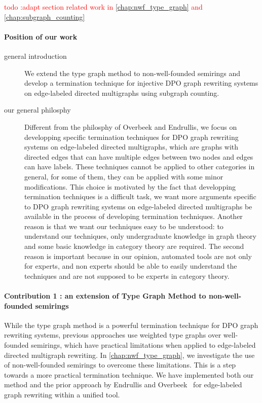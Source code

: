 \textcolor{red}{todo :adapt section related work in \autoref{chap:nwf_type_graph} and \autoref{chap:subgraph_counting}}

\paragraph{Position of our work}
\begin{description}
    \item[general introduction] We extend the type graph method to non-well-founded semirings and develop a termination technique for injective DPO graph rewriting systems on edge-labeled directed multigraphs using subgraph counting.
    \item[our general philosphy] Different from the philosphy of Overbeek and Endrullis, we focus on 
developping specific termination techniques for DPO graph rewriting systems on
edge-labeled directed multigraphs, which are graphs with directed edges that can have multiple edges between two nodes and edges can have labels. These techniques cannot be applied to other categories in general, for some of them, they can be applied with some minor modifications. This choice is motivated by the fact that developping termination techniques is a difficult task, we want more arguments specific to DPO graph rewriting systems on edge-labeled directed multigraphs be available in the process of developing termination techniques. Another reason is that we want our techniques easy to be understood: to understand our techniques, only undergraduate knowledge in graph theory and some basic knowledge in category theory are required. The second reason is important because in our opinion, automated tools are not only for experts, and non experts should be able to easily understand the techniques and are not supposed to be experts in category theory. 
\end{description}


\paragraph{Contribution 1 : an extension of Type Graph Method to non-well-founded semirings} While the type graph method is a powerful termination technique for DPO graph rewriting systems, previous approaches use weighted type graphs over well-founded semirings, which have practical limitations when applied to edge-labeled directed multigraph rewriting. In \autoref{chap:nwf_type_graph}, we investigate the use of non-well-founded semirings to overcome these limitations. This is a step towards a more practical termination technique.
We have implemented both our method and the prior approach by Endrullis and Overbeek~\cite{overbeek2024termination_lmcs} for edge-labeled graph rewriting within a unified tool.

